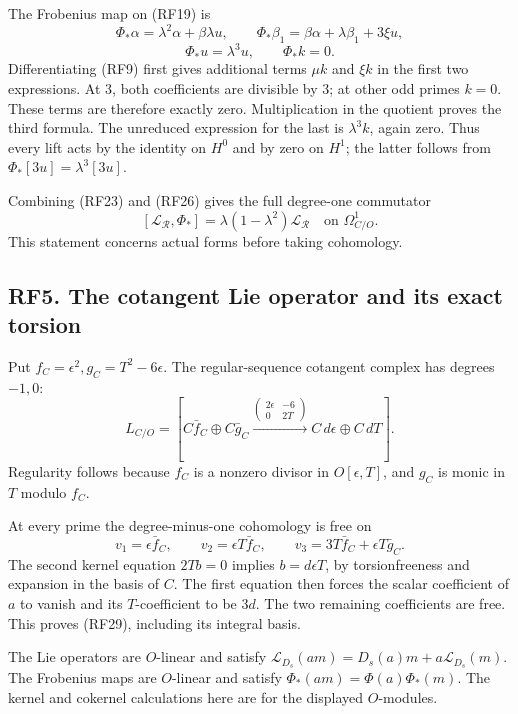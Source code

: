\documentclass[
]{article}
\begin{document}
The Frobenius map on (RF19) is \[
\Phi_*\alpha=\lambda^2\alpha+\beta\lambda u,\qquad
\Phi_*\beta_1=\beta\alpha+\lambda\beta_1+3\xi u,
\] \[
\Phi_*u=\lambda^3u,\qquad \Phi_*k=0.
\tag{RF26}
\] Differentiating (RF9) first gives additional terms \(\mu k\) and
\(\xi k\) in the first two expressions. At 3, both coefficients are
divisible by 3; at other odd primes \(k=0\). These terms are therefore
exactly zero. Multiplication in the quotient proves the third formula.
The unreduced expression for the last is \(\lambda^3k\), again zero.
Thus every lift acts by the identity on \(H^0\) and by zero on \(H^1\);
the latter follows from \(\Phi_*[3u]=\lambda^3[3u]\).

Combining (RF23) and (RF26) gives the full degree-one commutator \[
[\mathcal L_{\mathcal R},\Phi_*]
=\lambda(1-\lambda^2)\mathcal L_{\mathcal R}
\quad\text{on }\Omega^1_{C/O}.
\tag{RF27}
\] This statement concerns actual forms before taking cohomology.

\subsection{RF5. The cotangent Lie operator and its exact
torsion}\label{rf5.-the-cotangent-lie-operator-and-its-exact-torsion}

Put \(f_C=\epsilon^2,g_C=T^2-6\epsilon\). The regular-sequence cotangent
complex has degrees \(-1,0\): \[
L_{C/O}=
\left[C\bar f_C\oplus C\bar g_C
\xrightarrow{\left(\begin{smallmatrix}2\epsilon&-6\\0&2T\end{smallmatrix}\right)}
C\,d\epsilon\oplus C\,dT\right].
\tag{RF28}
\] Regularity follows because \(f_C\) is a nonzero divisor in
\(O[\epsilon,T]\), and \(g_C\) is monic in \(T\) modulo \(f_C\).

At every prime the degree-minus-one cohomology is free on \[
v_1=\epsilon\bar f_C,\qquad
v_2=\epsilon T\bar f_C,\qquad
v_3=3T\bar f_C+\epsilon T\bar g_C.
\tag{RF29}
\] The second kernel equation \(2Tb=0\) implies \(b=d\epsilon T\), by
torsionfreeness and expansion in the basis of \(C\). The first equation
then forces the scalar coefficient of \(a\) to vanish and its
\(T\)-coefficient to be \(3d\). The two remaining coefficients are free.
This proves (RF29), including its integral basis.

The Lie operators are \(O\)-linear and satisfy
\(\mathcal L_{D_s}(am)=D_s(a)m+a\mathcal L_{D_s}(m)\). The Frobenius
maps are \(O\)-linear and satisfy \(\Phi_*(am)=\Phi(a)\Phi_*(m)\). The
kernel and cokernel calculations here are for the displayed
\(O\)-modules.
\end{document}

